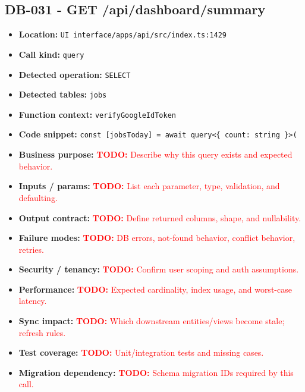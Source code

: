 \documentclass[11pt]{article}
\newcommand{\todoitem}[1]{\textcolor{red}{\textbf{TODO:} #1}}
\begin{document}
\subsection{DB-031 - GET /api/dashboard/summary}
\begin{itemize}[leftmargin=1.5em]
\item \textbf{Location:} \texttt{UI interface/apps/api/src/index.ts:1429}
\item \textbf{Call kind:} \texttt{query}
\item \textbf{Detected operation:} \texttt{SELECT}
\item \textbf{Detected tables:} \texttt{jobs}
\item \textbf{Function context:} \texttt{verifyGoogleIdToken}
\item \textbf{Code snippet:} \texttt{const [jobsToday] = await query<\{ count: string \}>(}
\item \textbf{Business purpose:} \todoitem{Describe why this query exists and expected behavior.}
\item \textbf{Inputs / params:} \todoitem{List each parameter, type, validation, and defaulting.}
\item \textbf{Output contract:} \todoitem{Define returned columns, shape, and nullability.}
\item \textbf{Failure modes:} \todoitem{DB errors, not-found behavior, conflict behavior, retries.}
\item \textbf{Security / tenancy:} \todoitem{Confirm user scoping and auth assumptions.}
\item \textbf{Performance:} \todoitem{Expected cardinality, index usage, and worst-case latency.}
\item \textbf{Sync impact:} \todoitem{Which downstream entities/views become stale; refresh rules.}
\item \textbf{Test coverage:} \todoitem{Unit/integration tests and missing cases.}
\item \textbf{Migration dependency:} \todoitem{Schema migration IDs required by this call.}
\end{itemize}
\end{document}
